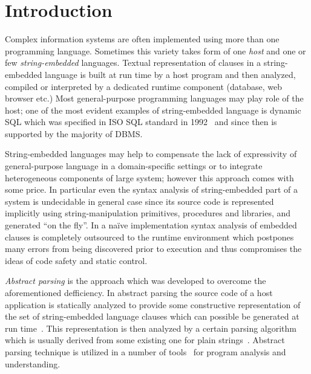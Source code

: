 \section{Introduction}

Complex information systems are often implemented using more than one programming language. 
Sometimes this variety takes form of one \emph{host} and one or few \emph{string-embedded}
languages. Textual representation of clauses in a string-embedded language is built at 
run time by a host program and then analyzed, compiled or interpreted by a dedicated 
runtime component (database, web browser etc.) Most general-purpose programming languages 
may play role of the host; one of the most evident examples of string-embedded language is 
dynamic SQL which was specified in ISO SQL standard in 1992~\cite{ISO} and since then is 
supported by the majority of DBMS. 



String-embedded languages may help to compensate the lack of expressivity of general-purpose
language in a domain-specific settings or to integrate heterogeneous components of large system;
however this approach comes with some price. In particular even the syntax analysis of 
string-embedded part of a system is undecidable in general case since its source code
is represented implicitly using string-manipulation primitives, procedures and libraries, and
generated ``on the fly''. In a na\"ive implementation syntax analysis of embedded clauses is
completely outsourced to the runtime environment which postpones many errors from being 
discovered prior to execution and thus compromises the ideas of code safety and static control.

\emph{Abstract parsing} is the approach which was developed to overcome the 
aforementioned defficiency. In abstract parsing the source code of a host application is statically 
analyzed to provide some constructive representation of the set of string-embedded language clauses which
can possible be generated at run time~\cite{AbstrParsing,StringExpr}. This representation is then analyzed 
by a certain parsing algorithm which is usually derived from some existing one for plain strings~\cite{Grune}.
Abstract parsing technique is utilized in a number of tools~\cite{JSA,PHPSA,ALVOR1,ALVOR2} for
program analysis and understanding.

